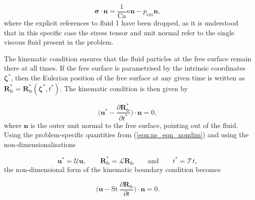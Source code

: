 \documentclass[aip,graphicx]{revtex4-1}
\newcommand{\sym}[1]{\text{#1}}
\newcommand{\pder}[2][]{\frac{\partial#1}{\partial#2}}
\newcommand{\vect}[1]{\bm{#1}}
\begin{document}
\begin{equation}
 \vect{\sigma} \cdot \vect{n} = \frac{1}{\sym{Ca}} \kappa \vect{n} - p_{\sym{ext}} \vect{n},
 \label{eqn:ns_eqn_dynamic_fs_bc_non_dim}
\end{equation}
where the explicit references to fluid 1 have been dropped, as it is understood that in this specific case the stress tensor and unit normal refer to the single viscous fluid present in the problem.

The kinematic condition ensures that the fluid particles at the free surface remain there at all times. 
If the free surface is parametrised by the intrinsic coordinates $\vect{\zeta}^*$, then the Eulerian position of the free surface at any given time is written as $\vect{R}_{\sym{fs}}^*=\vect{R}_{\sym{fs}}^*(\vect{\zeta}^*,t^*)$.
The kinematic condition is then given by

\begin{equation}
 \Bigg( \vect{u}^* - \pder[\vect{R}_{\sym{fs}}^*]{t^*} \Bigg) \cdot \vect{n} = 0,
\end{equation}
where $\vect{n}$ is the outer unit normal to the free surface, pointing out of the fluid. 
Using the problem-specific quantities from (\ref{eqn:ns_eqn_nondim}) and using the non-dimensionalisations

\begin{equation}
 \vect{u}^* = \mathcal{U} \vect{u}, \qquad \vect{R}_{\sym{fs}}^* = \mathcal{L} \vect{R}_{\sym{fs}} \qquad \text{and} \qquad t^*=\mathcal{T} t,
\end{equation}
the non-dimensional form of the kinematic boundary condition becomes

\begin{equation}
 \Bigg( \vect{u} - \sym{St} \: \pder[\vect{R}_{\sym{fs}}]{t} \Bigg) \cdot \vect{n} = 0.
 \label{eqn:ns_eqn_kinematic_fs_bc_non_dim}
\end{equation}
\end{document}
